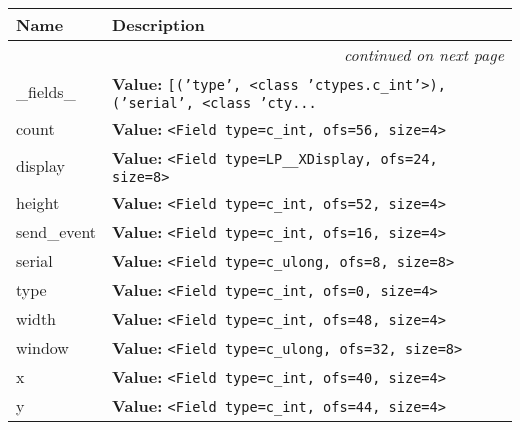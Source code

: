     \vspace{-1cm}
\hspace{\varindent}\begin{longtable}{|p{\varnamewidth}|p{\vardescrwidth}|l}
\cline{1-2}
\cline{1-2} \centering \textbf{Name} & \centering \textbf{Description}& \\
\cline{1-2}
\endhead\cline{1-2}\multicolumn{3}{r}{\small\textit{continued on next page}}\\\endfoot\cline{1-2}
\endlastfoot\raggedright \_\-f\-i\-e\-l\-d\-s\-\_\- & \raggedright \textbf{Value:} 
{\tt \texttt{[}\texttt{(}\texttt{'}\texttt{type}\texttt{'}\texttt{, }{\textless}class 'ctypes.c\_int'{\textgreater}\texttt{)}\texttt{, }\texttt{(}\texttt{'}\texttt{serial}\texttt{'}\texttt{, }{\textless}class 'cty\texttt{...}}&\\
\cline{1-2}
\raggedright c\-o\-u\-n\-t\- & \raggedright \textbf{Value:} 
{\tt {\textless}Field type=c\_int, ofs=56, size=4{\textgreater}}&\\
\cline{1-2}
\raggedright d\-i\-s\-p\-l\-a\-y\- & \raggedright \textbf{Value:} 
{\tt {\textless}Field type=LP\_\_XDisplay, ofs=24, size=8{\textgreater}}&\\
\cline{1-2}
\raggedright h\-e\-i\-g\-h\-t\- & \raggedright \textbf{Value:} 
{\tt {\textless}Field type=c\_int, ofs=52, size=4{\textgreater}}&\\
\cline{1-2}
\raggedright s\-e\-n\-d\-\_\-e\-v\-e\-n\-t\- & \raggedright \textbf{Value:} 
{\tt {\textless}Field type=c\_int, ofs=16, size=4{\textgreater}}&\\
\cline{1-2}
\raggedright s\-e\-r\-i\-a\-l\- & \raggedright \textbf{Value:} 
{\tt {\textless}Field type=c\_ulong, ofs=8, size=8{\textgreater}}&\\
\cline{1-2}
\raggedright t\-y\-p\-e\- & \raggedright \textbf{Value:} 
{\tt {\textless}Field type=c\_int, ofs=0, size=4{\textgreater}}&\\
\cline{1-2}
\raggedright w\-i\-d\-t\-h\- & \raggedright \textbf{Value:} 
{\tt {\textless}Field type=c\_int, ofs=48, size=4{\textgreater}}&\\
\cline{1-2}
\raggedright w\-i\-n\-d\-o\-w\- & \raggedright \textbf{Value:} 
{\tt {\textless}Field type=c\_ulong, ofs=32, size=8{\textgreater}}&\\
\cline{1-2}
\raggedright x\- & \raggedright \textbf{Value:} 
{\tt {\textless}Field type=c\_int, ofs=40, size=4{\textgreater}}&\\
\cline{1-2}
\raggedright y\- & \raggedright \textbf{Value:} 
{\tt {\textless}Field type=c\_int, ofs=44, size=4{\textgreater}}&\\
\cline{1-2}
\end{longtable}

